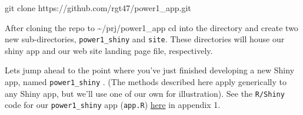 \documentclass[
  letterpaper,
  DIV=11,
  numbers=noendperiod,
  oneside]{scrartcl}
\newenvironment{Shaded}{\begin{snugshade}}{\end{snugshade}}
\newcommand{\FunctionTok}[1]{\textcolor[rgb]{0.28,0.35,0.67}{#1}}
\newcommand{\NormalTok}[1]{\textcolor[rgb]{0.00,0.23,0.31}{#1}}
\begin{document}
\begin{tcolorbox}
\begin{Shaded}
\begin{Highlighting}[]
\FunctionTok{git}\NormalTok{ clone https://github.com/rgt47/power1\_app.git}
\end{Highlighting}
\end{Shaded}

\end{tcolorbox}

After cloning the repo to \textasciitilde/prj/power1\_app cd into the
directory and create two new sub-directories, \texttt{power1\_shiny} and
\texttt{site}. These directories will house our shiny app and our web
site landing page file, respectively.

Lets jump ahead to the point where you've just finished developing a new
Shiny app, named \texttt{power1\_shiny} . (The methods described here
apply generically to any Shiny app, but we'll use one of our own for
illustration). See the \texttt{R/Shiny} code for our
\texttt{power1\_shiny} app (\texttt{app.R})
\protect\hyperlink{appendix-1}{here} in appendix 1.
\end{document}
